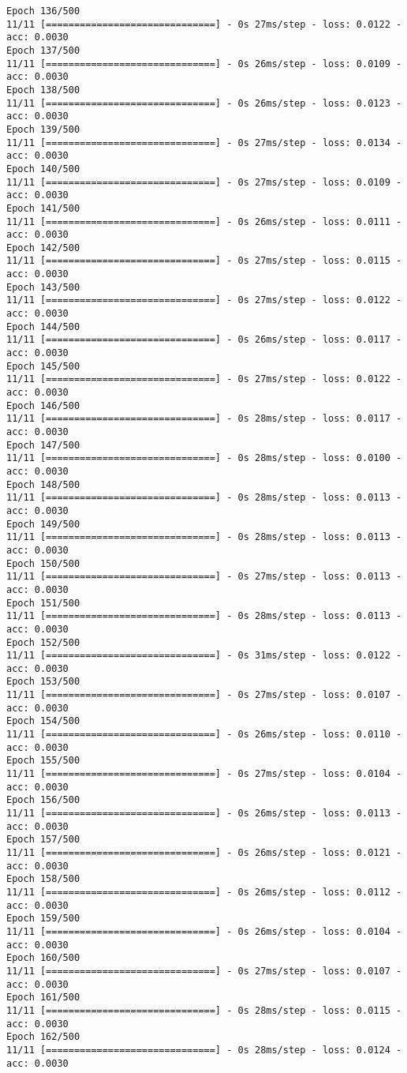 \documentclass[11pt]{article}
\begin{document}
\begin{Verbatim}[commandchars=\\\{\}]
Epoch 136/500
11/11 [==============================] - 0s 27ms/step - loss: 0.0122 - acc: 0.0030
Epoch 137/500
11/11 [==============================] - 0s 26ms/step - loss: 0.0109 - acc: 0.0030
Epoch 138/500
11/11 [==============================] - 0s 26ms/step - loss: 0.0123 - acc: 0.0030
Epoch 139/500
11/11 [==============================] - 0s 27ms/step - loss: 0.0134 - acc: 0.0030
Epoch 140/500
11/11 [==============================] - 0s 27ms/step - loss: 0.0109 - acc: 0.0030
Epoch 141/500
11/11 [==============================] - 0s 26ms/step - loss: 0.0111 - acc: 0.0030
Epoch 142/500
11/11 [==============================] - 0s 27ms/step - loss: 0.0115 - acc: 0.0030
Epoch 143/500
11/11 [==============================] - 0s 27ms/step - loss: 0.0122 - acc: 0.0030
Epoch 144/500
11/11 [==============================] - 0s 26ms/step - loss: 0.0117 - acc: 0.0030
Epoch 145/500
11/11 [==============================] - 0s 27ms/step - loss: 0.0122 - acc: 0.0030
Epoch 146/500
11/11 [==============================] - 0s 28ms/step - loss: 0.0117 - acc: 0.0030
Epoch 147/500
11/11 [==============================] - 0s 28ms/step - loss: 0.0100 - acc: 0.0030
Epoch 148/500
11/11 [==============================] - 0s 28ms/step - loss: 0.0113 - acc: 0.0030
Epoch 149/500
11/11 [==============================] - 0s 28ms/step - loss: 0.0113 - acc: 0.0030
Epoch 150/500
11/11 [==============================] - 0s 27ms/step - loss: 0.0113 - acc: 0.0030
Epoch 151/500
11/11 [==============================] - 0s 28ms/step - loss: 0.0113 - acc: 0.0030
Epoch 152/500
11/11 [==============================] - 0s 31ms/step - loss: 0.0122 - acc: 0.0030
Epoch 153/500
11/11 [==============================] - 0s 27ms/step - loss: 0.0107 - acc: 0.0030
Epoch 154/500
11/11 [==============================] - 0s 26ms/step - loss: 0.0110 - acc: 0.0030
Epoch 155/500
11/11 [==============================] - 0s 27ms/step - loss: 0.0104 - acc: 0.0030
Epoch 156/500
11/11 [==============================] - 0s 26ms/step - loss: 0.0113 - acc: 0.0030
Epoch 157/500
11/11 [==============================] - 0s 26ms/step - loss: 0.0121 - acc: 0.0030
Epoch 158/500
11/11 [==============================] - 0s 26ms/step - loss: 0.0112 - acc: 0.0030
Epoch 159/500
11/11 [==============================] - 0s 26ms/step - loss: 0.0104 - acc: 0.0030
Epoch 160/500
11/11 [==============================] - 0s 27ms/step - loss: 0.0107 - acc: 0.0030
Epoch 161/500
11/11 [==============================] - 0s 28ms/step - loss: 0.0115 - acc: 0.0030
Epoch 162/500
11/11 [==============================] - 0s 28ms/step - loss: 0.0124 - acc: 0.0030

\end{Verbatim}
\end{document}
